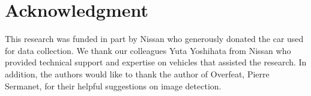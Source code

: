 \documentclass[journal]{IEEEtran}
\begin{document}

%



\section*{Acknowledgment}

This research was funded in part by Nissan who generously donated the car used for data collection. We thank our colleagues Yuta Yoshihata from Nissan who provided technical support and expertise on vehicles that assisted the research. In addition, the authors would like to thank the author of Overfeat, Pierre Sermanet, for their helpful suggestions on image detection. 





\end{document}
